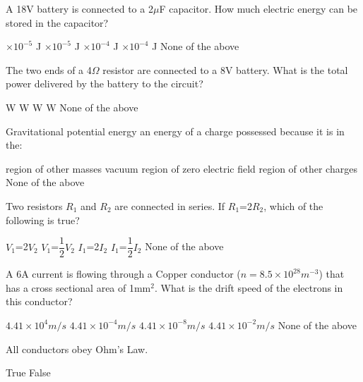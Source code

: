 \documentclass[13pt,addpoints]{exam}
\begin{document}
{{{\begin{questions}
\begin{oneparchoices}
					\end{oneparchoices}
					\question A 18V battery is connected to a 2$\mu$F capacitor. How much electric energy can be stored in the capacitor?\\
					\begin{oneparchoices}
						$\times10^{-5}$ J
						$\times10^{-5}$ J
						$\times10^{-4}$ J
						$\times10^{-4}$ J
						\choice None of the above
					\end{oneparchoices}
					\question The two ends of a 4$\Omega$ resistor are connected to a 8V battery. What is the total power delivered by the battery to the circuit?\\
					\begin{oneparchoices}
						\choice 4 W 
						\choice 16 W
						\choice 32 W
						\choice 64 W
						\choice None of the above
					\end{oneparchoices}
					\question Gravitational potential energy an energy of a charge possessed because it is in the:\\
					\begin{oneparchoices}
						\choice region of other masses
						\choice vacuum
						\choice region of zero electric field
						\choice region of other charges
						\choice None of the above
					\end{oneparchoices}
					\question Two resistors $R_1$ and $R_2$ are connected in series. If $R_1$=2$R_2$, which of the following is true?\\
					\begin{oneparchoices}
						\choice $V_1$=2$V_2$
						\choice $V_1$=$\dfrac{1}{2}$$V_2$
						\choice $I_1$=2$I_2$
						\choice $I_1$=$\dfrac{1}{2}$$I_2$
						\choice None of the above
					\end{oneparchoices}
					\question A 6A current is flowing through a Copper conductor ($n= 8.5\times10^{28}m^{-3}$) that has a cross sectional area of 1mm$^2$. What is the drift speed of the electrons in this conductor?\\
					\begin{oneparchoices}
						\choice $4.41\times10^{4}m/s$
						\choice $4.41\times10^{-4}m/s$
						\choice $4.41\times10^{-8}m/s$
						\choice $4.41\times10^{-2}m/s$
						\choice None of the above
					\end{oneparchoices}
					\question All conductors obey Ohm's Law.\\
					\begin{oneparchoices}
						\choice True
						\choice False

\end{oneparchoices}
\end{questions}}}}
\end{document}
